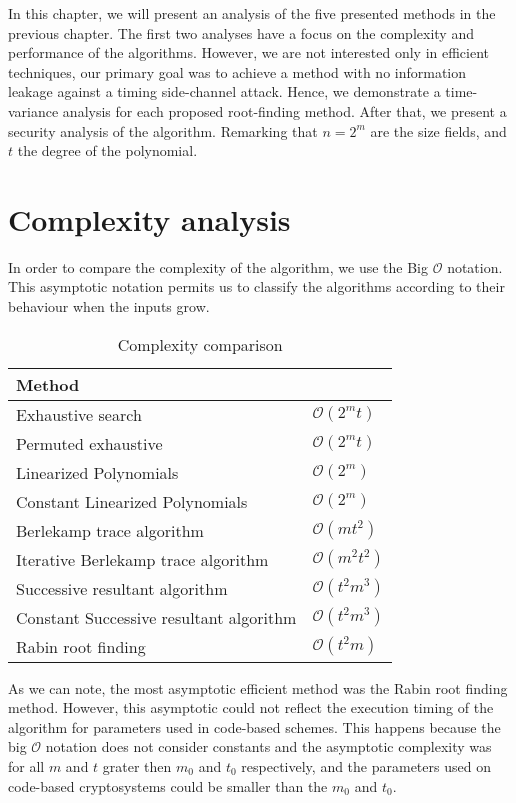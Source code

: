 In this chapter, we will present an analysis of the five presented methods in the previous chapter. The first two analyses have a focus on the complexity and performance of the algorithms. However, we are not interested only in efficient techniques, our primary goal was to achieve a method with no information leakage against a timing side-channel attack. Hence, we demonstrate a time-variance analysis for each proposed root-finding method. After that, we present a security analysis of the algorithm. Remarking that $n = 2^m$ are the size fields, and $t$ the degree of the polynomial.

\section{Complexity analysis}
In order to compare the complexity of the algorithm, we use the Big $\mathcal{O}$ notation. This asymptotic notation permits us to classify the algorithms according to their behaviour when the inputs grow. 

\begin{table}[ht]
\centering
\label{tab:complexity}
\caption{Complexity comparison}
\begin{tabular}{ll}
Method                                  &                \\ \hline
Exhaustive search                       & $\mathcal{O}(2^mt)$ \\
Permuted exhaustive                     & $\mathcal{O}(2^mt)$ \\
Linearized Polynomials                  & $\mathcal{O}(2^m)$ \\
Constant Linearized Polynomials         & $\mathcal{O}(2^m)$ \\
Berlekamp trace algorithm               & $\mathcal{O}(mt^2)$ \\
Iterative Berlekamp trace algorithm     & $\mathcal{O}(m^2t^2)$ \\
Successive resultant algorithm          & $\mathcal{O}(t^2m^3)$ \\
Constant Successive resultant algorithm & $\mathcal{O}(t^2m^3)$ \\
Rabin root finding                      & $\mathcal{O}(t^2m)$
\end{tabular}
\end{table}

As we can note, the most asymptotic efficient method was the Rabin root finding method. However, this asymptotic could not reflect the execution timing of the algorithm for parameters used in code-based schemes. This happens because the big $\mathcal{O}$ notation does not consider constants and the asymptotic complexity was for all $m$ and $t$ grater then $m_0$ and $t_0$ respectively, and the parameters used on code-based cryptosystems could be smaller than the $m_0$ and $t_0$.

